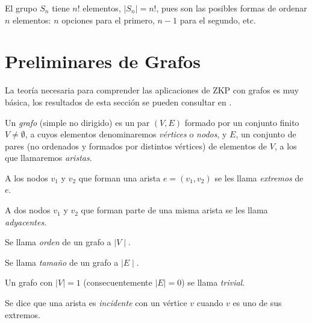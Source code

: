 \begin{remark}
	El grupo $S_n$ tiene $n!$ elementos, $\mid S_n \mid = n!$, pues son las posibles formas de ordenar $n$ elementos: $n$ opciones para el primero, $n-1$ para el segundo, etc.
\end{remark}





%
%
%
%
%
%






\hfil

\section{Preliminares de Grafos}

La teoría necesaria para comprender las aplicaciones de ZKP con grafos es muy básica, los resultados de esta sección se pueden consultar en \citep{grafosyOD}.

\begin{definition}
	Un \textit{grafo} (simple no dirigido) es un par $(V,E)$ formado por un conjunto finito $V \neq \emptyset$, a cuyos elementos denominaremos \textit{vértices} o \textit{nodos}, y $E$, un conjunto de pares (no ordenados y formados por distintos vértices) de elementos de $V$, a los que llamaremos \textit{aristas}.
	
	A los nodos $v_1$ y $v_2$ que forman una arista $e = (v_1, v_2)$ se les llama \textit{extremos} de $e$.
\end{definition}


\begin{definition}[Conceptos]
	\hfil
	
	A dos nodos $v_1$ y $v_2$ que forman parte de una misma arista se les llama \textit{adyacentes}.
	
	Se llama \textit{orden} de un grafo a $\mid V \mid $.
	
	Se llama \textit{tamaño} de un grafo a $\mid E \mid $.
	
	Un grafo con $ \mid V \mid = 1$ (consecuentemente $\mid E \mid = 0$) se llama \textit{trivial}.
	
	Se dice que una arista es \textit{incidente} con un vértice $v$ cuando $v$ es uno de sus extremos.
\end{definition}



